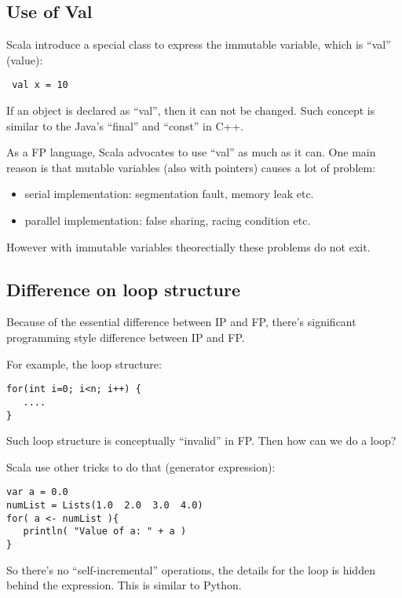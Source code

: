 \documentclass[notheorems, aspectratio=54]{beamer}
\begin{document}
\subsection{Use of Val}
\begin{frame}[fragile]

Scala introduce a special class to express the immutable variable, 
which is ``val'' (value):
\begin{verbatim}
 val x = 10
\end{verbatim}
If an object is declared as ``val'', then it can not be changed. Such concept 
is similar to the Java's ``final'' and ``const'' in C++. 

As a FP language, Scala advocates to use ``val'' as much as it can. One main reason is that mutable variables (also with pointers) causes a lot of problem:
\begin{itemize}
 \item serial implementation: segmentation fault, memory leak etc.
 \item parallel implementation: false sharing, racing condition etc.
\end{itemize}
However with immutable variables theorectially these problems do not exit.

\end{frame}

\subsection{Difference on loop structure}
\begin{frame}[fragile]

Because of the essential difference between IP and FP, there's 
significant programming style difference between IP and FP. 

For example, the loop structure:
\begin{verbatim}
for(int i=0; i<n; i++) {
   ....
}
\end{verbatim}
Such loop structure is conceptually ``invalid'' in FP. Then how can we do a loop?

Scala use other tricks to do that (generator expression):
\begin{verbatim}
var a = 0.0
numList = Lists(1.0  2.0  3.0  4.0)
for( a <- numList ){
   println( "Value of a: " + a )
} 
\end{verbatim}
So there's no ``self-incremental'' operations, the details for the loop is hidden behind the expression. This is similar to Python.

\end{frame}
\end{document}
